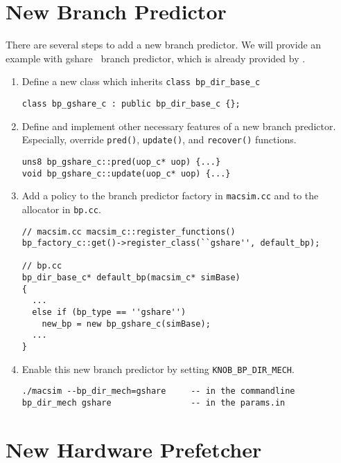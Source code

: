 \section{New Branch Predictor}

There are several steps to add a new branch predictor. We will provide
an example with gshare~\cite{mcf93} branch predictor, which is already
provided by \SIM.

\begin{enumerate}[Step 1.]
  \item Define a new class which inherits \Verb+class bp_dir_base_c+
\begin{Verbatim}
class bp_gshare_c : public bp_dir_base_c {};
\end{Verbatim}

  \item Define and implement other necessary features of a new branch
    predictor. Especially, override \Verb+pred()+, \Verb+update()+,
    and \Verb+recover()+ functions.
\begin{Verbatim}
uns8 bp_gshare_c::pred(uop_c* uop) {...}
void bp_gshare_c::update(uop_c* uop) {...}

\end{Verbatim}

  \item Add a policy to the branch predictor factory in
    \Verb+macsim.cc+ and to the allocator in \Verb+bp.cc+.

\begin{Verbatim}
// macsim.cc macsim_c::register_functions()
bp_factory_c::get()->register_class(``gshare'', default_bp);

// bp.cc
bp_dir_base_c* default_bp(macsim_c* simBase)
{
  ...
  else if (bp_type == ''gshare'')
    new_bp = new bp_gshare_c(simBase);
  ...
}
\end{Verbatim}

  \item Enable this new branch predictor by setting \Verb+KNOB_BP_DIR_MECH+.
\begin{Verbatim}
./macsim --bp_dir_mech=gshare     -- in the commandline
bp_dir_mech gshare                -- in the params.in
\end{Verbatim}
\end{enumerate}


\section{New Hardware Prefetcher}

